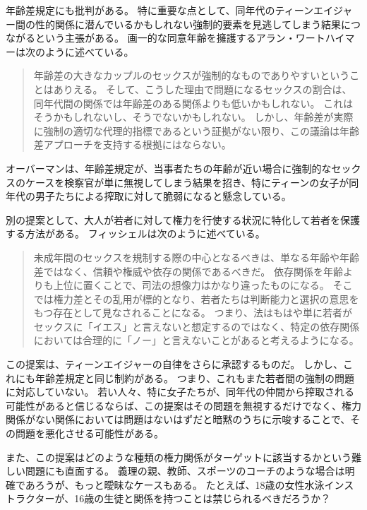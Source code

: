\documentclass[paper=a4,book,openany]{jlreq}
\begin{document}
年齢差規定にも批判がある。
特に重要な点として、同年代のティーンエイジャー間の性的関係に潜んでいるかもしれない強制的要素を見逃してしまう結果につながるという主張がある。
画一的な同意年齢を擁護するアラン・ワートハイマーは次のように述べている。

\begin{quote}
年齢差の大きなカップルのセックスが強制的なものでありやすいということはありえる。
そして、こうした理由で問題になるセックスの割合は、同年代間の関係では年齢差のある関係よりも低いかもしれない。
これはそうかもしれないし、そうでないかもしれない。
しかし、年齢差が実際に強制の適切な代理的指標であるという証拠がない限り、この議論は年齢差アプローチを支持する根拠にはならない。
\citep[p.218]{wertheimer03:_consen_sexual_relat}
\end{quote}

オーバーマンは、年齢差規定が、当事者たちの年齢が近い場合に強制的なセックスのケースを検察官が単に無視してしまう結果を招き、特にティーンの女子が同年代の男子たちによる搾取に対して脆弱になると懸念している\citep[p.751]{oberman01:_girls_master_house}。

別の提案として、大人が若者に対して権力を行使する状況に特化して若者を保護する方法がある。
フィッシェルは次のように述べている。

\begin{quote}
未成年間のセックスを規制する際の中心となるべきは、単なる年齢や年齢差ではなく、信頼や権威や依存の関係であるべきだ。
依存関係を年齢よりも上位に置くことで、司法の想像力はかなり違ったものになる。
そこでは権力差とその乱用が標的となり、若者たちは判断能力と選択の意思をもつ存在として見なされることになる。
つまり、法はもはや単に若者がセックスに「イエス」と言えないと想定するのではなく、特定の依存関係においては合理的に「ノー」と言えないことがあると考えるようになる。
\citep[pp. 315--316]{fischel10:_per_se_power}
\end{quote}

この提案は、ティーンエイジャーの自律をさらに承認するものだ。
しかし、これにも年齢差規定と同じ制約がある。
つまり、これもまた若者間の強制の問題に対応していない。
若い人々、特に女子たちが、同年代の仲間から搾取される可能性があると信じるならば、この提案はその問題を無視するだけでなく、権力関係がない関係においては問題はないはずだと暗黙のうちに示唆することで、その問題を悪化させる可能性がある。

また、この提案はどのような種類の権力関係がターゲットに該当するかという難しい問題にも直面する。
義理の親、教師、スポーツのコーチのような場合は明確であろうが、もっと曖昧なケースもある。
たとえば、18歳の女性水泳インストラクターが、16歳の生徒と関係を持つことは禁じられるべきだろうか？
\end{document}
